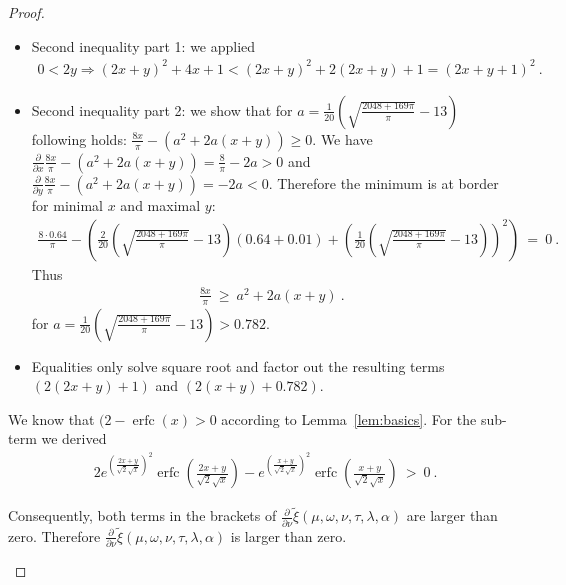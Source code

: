 \documentclass{article}
\newcommand\xinn{{\tilde \xi}}
\renewcommand{\geq}{\geqslant}
\DeclareMathOperator{\erfc}{erfc}
\begin{document}
\begin{proof}
\begin{itemize}
\begin{itemize}
\item Second inequality part 1: we applied
\begin{align}
0<2 y\Longrightarrow (2 x+y)^2+4 x+1<(2 x+y)^2+2 (2 x+y)+1=(2 x+y+1)^2
  \ .
\end{align}
\item Second inequality part 2: we show that for $a=\frac{1}{20}
  \left(\sqrt{\frac{2048+169 \pi }{\pi }}-13\right)$ following holds:
$\frac{8 x}{\pi }-\left(a^2+2 a (x+y)\right) \geq 0$. 
We have $\frac{\partial }{\partial x }\frac{8 x}{\pi }-\left(a^2+2 a
  (x+y)\right)=\frac{8}{\pi }-2 a>0$ and
 $\frac{\partial }{\partial y }\frac{8 x}{\pi }-\left(a^2+2 a
  (x+y)\right)=-2 a<0$. 
Therefore the minimum is at border for minimal $x$ and maximal $y$:
\begin{align}
\frac{8 \cdot 0.64}{\pi }-\left(\frac{2}{20} \left(\sqrt{\frac{2048+169 \pi
  }{\pi }}-13\right) (0.64+0.01)+\left(\frac{1}{20}
  \left(\sqrt{\frac{2048+169 \pi }{\pi }}-13\right)\right)^2\right) \
  = \ 0 \ .
\end{align}
Thus
\begin{align}
\frac{8 x}{\pi } \ \geq \ a^2+2 a (x+y) \ .
\end{align}
for $a=\frac{1}{20}
  \left(\sqrt{\frac{2048+169 \pi }{\pi }}-13\right) > 0.782$.

\item Equalities only solve square root and factor out the resulting
  terms $(2(2 x+y)+1)$ and $(2(x+y)+0.782)$.
\end{itemize}

We know that $(2 - \erfc (x) > 0$ according to 
Lemma~\ref{lem:basics}.
For the sub-term we derived  
\begin{align}
&2 e^{\left(\frac{2 x+y}{\sqrt{2} \sqrt{x}}\right)^2} \erfc \left(\frac{2 x+y}{\sqrt{2} \sqrt{x}}\right)-e^{\left(\frac{x+y}{\sqrt{2} \sqrt{x}}\right)^2} \erfc \left(\frac{x+y}{\sqrt{2} \sqrt{x}}\right)\ > \ 0 \ .
\end{align}

Consequently, both terms in the brackets of  $\frac{\partial
}{\partial \nu }
\xinn(\mu,\omega,\nu,\tau,\lambda ,\alpha )$
are larger than zero.
Therefore  $\frac{\partial
}{\partial \nu }
\xinn(\mu,\omega,\nu,\tau,\lambda ,\alpha )$
is larger than zero.
\end{itemize}

\end{proof}
\end{document}
